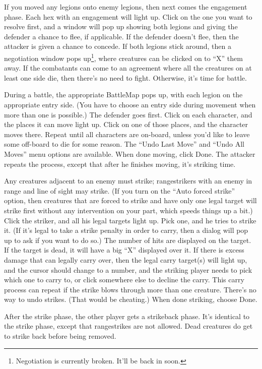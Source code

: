 \documentclass{article}
\begin{document}
If you moved any legions onto enemy legions, then next comes the engagement
phase. Each hex with an engagement will light up. Click on the one you want
to resolve first, and a window will pop up showing both legions and giving the
defender a chance to flee, if applicable. If the defender doesn't flee, then
the attacker is given a chance to concede. If both legions stick around, then
a negotiation window pops up\footnote{Negotiation is currently broken.
It'll be back in soon.}, where creatures can be clicked on to ``X'' them
away. If the combatants can come to an agreement where all the creatures on
at least one side die, then there's no need to fight. Otherwise, it's time
for battle.

During a battle, the appropriate BattleMap pops up, with each legion on the
appropriate entry side. (You have to choose an entry side during movement
when more than one is possible.) The defender goes first. Click on each
character, and the places it can move light up. Click on one of those
places, and the character moves there. Repeat until all characters are
on-board, unless you'd like to leave some off-board to die for some reason.
The ``Undo Last Move'' and ``Undo All Moves'' menu options are available. When
done moving, click Done. The attacker repeats the process, except that 
after he finishes moving, it's striking time.

Any creatures adjacent to an enemy must strike; rangestrikers with an enemy in
range and line of sight may strike. (If you turn on the ``Auto forced strike''
option, then creatures that are forced to strike and have only one legal
target will strike first without any intervention on your part, which speeds
things up a bit.) Click the striker, and all his legal targets light up. 
Pick one, and he tries to strike it. (If it's legal to take a strike penalty 
in order to carry, then a dialog will pop up to ask if you want to do so.) 
The number of hits are displayed on the target. If the target is dead, it 
will have a big ``X'' displayed over it. If there is excess damage that can 
legally carry over, then the legal carry target(s) will light up, and the
cursor should change to a number, and the striking player needs to pick 
which one to carry to, or click somewhere else to decline the carry. This 
carry process can repeat if the strike blows through more than one creature. 
There's no way to undo strikes. (That would be cheating.) When done 
striking, choose Done. 

After the strike phase, the other player gets a strikeback phase. It's
identical to the strike phase, except that rangestrikes are not allowed.
Dead creatures do get to strike back before being removed.
\end{document}
